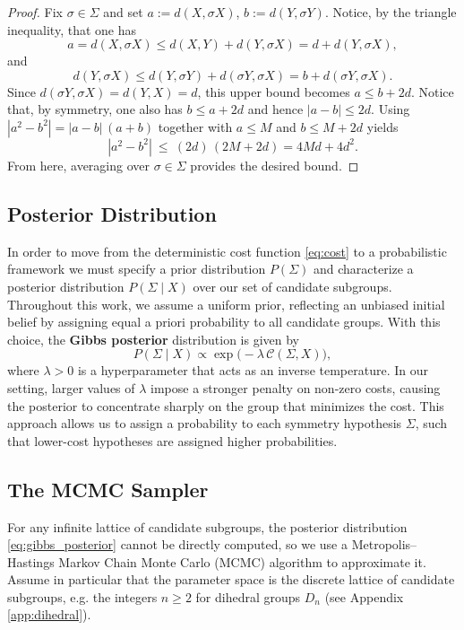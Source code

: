 \documentclass[11pt]{amsart}
\begin{document}
\begin{proof}
Fix $\sigma\in\Sigma$ and set $a:=d(X,\sigma X)$, $b:=d(Y,\sigma Y)$. Notice, by the triangle inequality, that one has
\[
a = d(X,\sigma X) \leq d(X,Y) + d(Y,\sigma X) = d + d(Y,\sigma X),
\]
and
\[
d(Y,\sigma X) \leq d(Y,\sigma Y) + d(\sigma Y, \sigma X) = b +  d(\sigma Y, \sigma X).
\]
Since $d(\sigma Y, \sigma X) = d(Y,X) = d$, this upper bound becomes $a \leq b + 2d$. 
Notice that, by symmetry, one also has $b\le a+2d$ and hence $|a-b|\le 2d$. Using $|a^2-b^2|=|a-b|\,(a+b)$ together with $a\le M$ and $b\le M+2d$ yields
\[
|a^2-b^2|\ \le\ (2d)\,(2M+2d) = 4Md + 4d^2.
\]
From here, averaging over $\sigma\in\Sigma$ provides the desired bound.
\end{proof}
\subsection{Posterior Distribution}
In order to move from the deterministic cost function \eqref{eq:cost} to a probabilistic framework we must specify a prior distribution $P(\Sigma)$ and characterize a posterior distribution $ P(\Sigma \mid X)$ over our set of candidate subgroups. Throughout this work, we assume a uniform prior, reflecting an unbiased initial belief by assigning equal a priori probability to all candidate groups. With this choice, the \textbf{Gibbs posterior} distribution is given by
\begin{equation}\label{eq:gibbs_posterior}
    P(\Sigma \mid X) \propto \exp\big(-\lambda \,\mathcal{C}(\Sigma,X)\big),
\end{equation}
where $\lambda > 0$ is a hyperparameter that acts as an inverse temperature. In our setting, larger values of $\lambda$ impose a stronger penalty on non-zero costs, causing the posterior to concentrate sharply on the group that minimizes the cost. This approach allows us to assign a probability to each symmetry hypothesis $\Sigma$, such that lower-cost hypotheses are assigned higher probabilities. 
\subsection{The MCMC Sampler}
For any infinite lattice of candidate subgroups, the posterior distribution \eqref{eq:gibbs_posterior} cannot be directly computed, so we use a Metropolis--Hastings Markov Chain Monte Carlo (MCMC) algorithm to approximate it. Assume in particular that the parameter space is the discrete lattice of candidate subgroups, e.g. the integers $n \geq 2$ for dihedral groups $D_n$ (see Appendix \ref{app:dihedral}).
\end{document}
